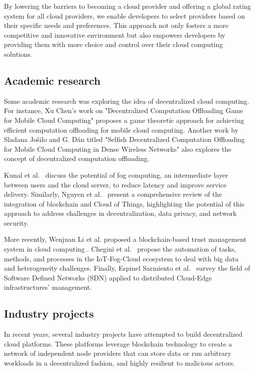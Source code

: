 By lowering the barriers to becoming a cloud provider and offering a global rating system for all cloud providers, we enable developers to select providers based on their specific needs and preferences. This approach not only fosters a more competitive and innovative environment but also empowers developers by providing them with more choice and control over their cloud computing solutions.

\subsection{Academic research}

Some academic research was exploring the idea of decentralized cloud computing. For instance, Xu Chen's work on "Decentralized Computation Offloading Game for Mobile Cloud Computing" \cite{chen2014decentralized} proposes a game theoretic approach for achieving efficient computation offloading for mobile cloud computing. Another work by Sladana Jošilo and G. Dán titled "Selfish Decentralized Computation Offloading for Mobile Cloud Computing in Dense Wireless Networks" \cite{josilo2018selfish} also explores the concept of decentralized computation offloading.

Kunal et al.~\cite{kunal2019overview} discuss the potential of fog computing, an intermediate layer between users and the cloud server, to reduce latency and improve service delivery.
Similarly, Nguyen et al.~\cite{nguyen2020integration} present a comprehensive review of the integration of blockchain and Cloud of Things, highlighting the potential of this approach to address challenges in decentralization, data privacy, and network security.

More recently, Wenjuan Li et al. proposed a blockchain-based trust management system in cloud computing \cite{li2021blockchain}.
Chegini et al.~\cite{chegini2021process} propose the automation of tasks, methods, and processes in the IoT-Fog-Cloud ecosystem to deal with big data and heterogeneity challenges. Finally, Espinel Sarmiento et al.~\cite{sarmiento2021decentralized} survey the field of Software Defined Networks (SDN) applied to distributed Cloud-Edge infrastructures' management.


\subsection{Industry projects}

In recent years, several industry projects have attempted to build decentralized cloud platforms. These platforms leverage blockchain technology to create a network of independent node providers that can store data or run arbitrary workloads in a decentralized fashion, and highly resilient to malicious actors.

